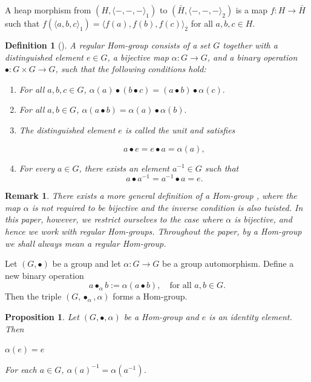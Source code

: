 \documentclass[14pt]{article}
\newtheorem{prop}[thm]{Proposition}
\theoremstyle{Definition}
\newtheorem{Def}[thm]{Definition}
\newtheorem{Rem}[thm]{Remark}
\theoremstyle{remark}
\begin{document}
A heap morphism from $(H,\langle -,-,- \rangle_{1})$ to $(\bar{H},\langle -,-,- \rangle_{2})$ is a map $f:H\to \bar{H}$ such that $f(\langle a,b,c\rangle_{1})=\langle f(a),f(b),f(c)\rangle_{2}$ for all $a,b,c\in H$.



\begin{Def}[\cite{Hass}]
A regular \emph{Hom-group} consists of a set $G$ together with a distinguished element $e \in G$, a bijective map $\alpha : G \to G$, and a binary operation $\bullet : G \times G \to G$, such that the following conditions hold:
\begin{enumerate}
    \item[(i)] For all $a,b,c \in G$,  $\alpha(a) \bullet (b \bullet c) = (a \bullet b) \bullet \alpha(c).$
   
    \item[(ii)] For all $a,b \in G$, $\alpha(a \bullet b) = \alpha(a) \bullet \alpha(b).$
    
    \item[(iii)] The distinguished element $e$ is called the \emph{unit} and satisfies
    
        $$a \bullet e = e \bullet a = \alpha(a),$$
   
    \item[(iv)] For every $a \in G$, there exists an element $a^{-1} \in G$ such that 
    \[
        a \bullet a^{-1} = a^{-1} \bullet a = e.
    \]
\end{enumerate}
\end{Def}

\begin{Rem}
There exists a more general definition of a Hom-group \cite{Lau}, where the map $\alpha$ is not required to be bijective and the inverse condition is also twisted. In this paper, however, we restrict ourselves to the case where $\alpha$ is bijective, and hence we work with \emph{regular Hom-groups}. Throughout the paper, by a Hom-group we shall always mean a regular Hom-group.
\end{Rem}


Let $(G,\bullet)$ be a group and let $\alpha : G \to G$ be a group automorphism. Define a new binary operation 
\[
    a \bullet_{\alpha} b := \alpha(a \bullet b), \quad \text{for all } a,b \in G.
\]
Then the triple $(G, \bullet_{\alpha}, \alpha)$ forms a Hom-group.

\begin{prop}
Let $(G,\bullet,\alpha)$ be a Hom-group and $e$ is an identity element. Then 
\item[(i)]\cite{Jia} $\alpha(e) = e$
\item[(ii)]\cite{Has} For each $a\in G$, $\alpha(a)^{-1}=\alpha(a^{-1})$.
\end{prop}
\end{document}
